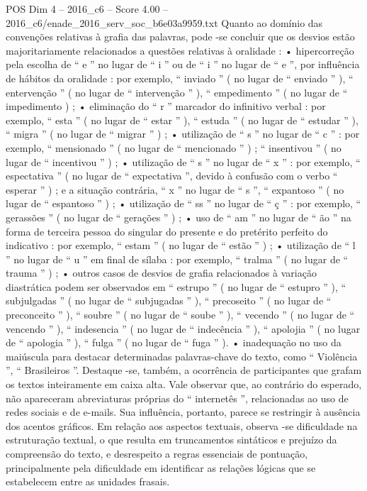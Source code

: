 \begin{textsample}{POS Dim 4 – 2016\_c6 – Score 4.00 – 2016\_c6/enade\_2016\_serv\_soc\_b6e03a9959.txt}
Quanto ao domínio das convenções relativas à grafia das palavras, pode -se concluir que os desvios estão majoritariamente relacionados a questões relativas à oralidade : • hipercorreção pela escolha de “ e ” no lugar de “ i ” ou de “ i ” no lugar de “ e ”, por influência de hábitos da oralidade : por exemplo, “ inviado ” ( no lugar de “ enviado ” ), “ entervenção ” ( no lugar de “ intervenção ” ), “ empedimento ” ( no lugar de “ impedimento ) ; • eliminação do “ r ” marcador do infinitivo verbal : por exemplo, “ esta ” ( no lugar de “ estar ” ), “ estuda ” ( no lugar de “ estudar ” ), “ migra ” ( no lugar de “ migrar ” ) ; • utilização de “ s ” no lugar de “ c ” : por exemplo, “ mensionado ” ( no lugar de “ mencionado ” ) ; “ insentivou ” ( no lugar de “ incentivou ” ) ; • utilização de “ s ” no lugar de “ x ” : por exemplo, “ espectativa ” ( no lugar de “ expectativa ”, devido à confusão com o verbo “ esperar ” ) ; e a situação contrária, “ x ” no lugar de “ s ”, “ expantoso ” ( no lugar de “ espantoso ” ) ; • utilização de “ ss ” no lugar de “ ç ” : por exemplo, “ gerassões ” ( no lugar de “ gerações ” ) ; • uso de “ am ” no lugar de “ ão ” na forma de terceira pessoa do singular do presente e do pretérito perfeito do indicativo : por exemplo, “ estam ” ( no lugar de “ estão ” ) ; • utilização de “ l ” no lugar de “ u ” em final de sílaba : por exemplo, “ tralma ” ( no lugar de “ trauma ” ) ; • outros casos de desvios de grafia relacionados à variação diastrática podem ser observados em “ estrupo ” ( no lugar de “ estupro ” ), “ subjulgadas ” ( no lugar de “ subjugadas ” ), “ precoseito ” ( no lugar de “ preconceito ” ), “ soubre ” ( no lugar de “ soube ” ), “ vecendo ” ( no lugar de “ vencendo ” ), “ indesencia ” ( no lugar de “ indecência ” ), “ apolojia ” ( no lugar de “ apologia ” ), “ fulga ” ( no lugar de “ fuga ” ). • inadequação no uso da maiúscula para destacar determinadas palavras-chave do texto, como “ Violência ”, “ Brasileiros ”.
Destaque -se, também, a ocorrência de participantes que grafam os textos inteiramente em caixa alta.
Vale observar que, ao contrário do esperado, não apareceram abreviaturas próprias do “ internetês ”, relacionadas ao uso de redes sociais e de e-mails.
Sua influência, portanto, parece se restringir à ausência dos acentos gráficos.
Em relação aos aspectos textuais, observa -se dificuldade na estruturação textual, o que resulta em truncamentos sintáticos e prejuízo da compreensão do texto, e desrespeito a regras essenciais de pontuação, principalmente pela dificuldade em identificar as relações lógicas que se estabelecem entre as unidades frasais.

\end{textsample}
